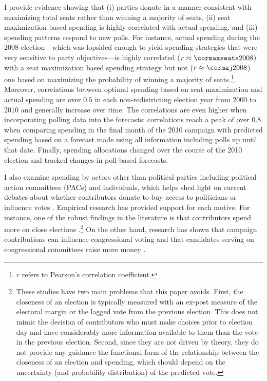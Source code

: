 \documentclass[12pt,final,fleqn]{article}
\theoremstyle{plain}
\begin{document}
I provide evidence showing that (i) parties donate in a manner consistent with maximizing total seats rather than winning a majority of seats, (ii) seat maximization based spending is highly correlated with actual spending, and (iii) spending patterns respond to new polls. For instance, actual spending during the 2008 election---which was lopsided enough to yield spending strategies that were very sensitive to party objectives---is highly correlated ($r \approx \cormaxseats2008$) with a seat maximization based spending strategy but not ($r \approx \cormaj2008$) one based on maximizing the probability of winning a majority of seats.\footnote{$r$ refers to Pearson's correlation coefficient.}. Moreover, correlations between optimal spending based on seat maximization and actual spending are over $0.5$ in each non-redistricting election year from 2000 to 2010 and generally increase over time. The correlations are even higher when incorporating polling data into the forecasts: correlations reach a peak of over 0.8 when comparing spending in the final month of the 2010 campaign with predicted spending based on a forecast made using all information including polls up until that date. Finally, spending allocations changed over the course of the 2010 election and tracked changes in poll-based forecasts.  

I also examine spending by actors other than political parties including political action committees (PACs) and individuals, which helps shed light on current debates about whether contributors donate to buy access to politicians or influence votes \citep[e.g.,][]{stratmann2005some}. Empirical research has provided support for each motive. For instance, one of the robust findings in the literature is that contributors spend more on close elections \citep{jacobson1985money,kau1982general, poole1985patterns, stratmann1991campaign}.\footnote{These studies have two main problems that this paper avoids. First, the closeness of an election is typically measured with an ex-post measure of the electoral margin or the lagged vote from the previous election. This does not mimic the decision of contributors who must make choices prior to election day and have considerably more information available to them than the vote in the previous election. Second, since they are not driven by theory, they do not provide any guidance the functional form of the relationship between the closeness of an election and spending, which should depend on the uncertainty (and probability distribution) of the predicted vote.} On the other hand, research has shown that campaign contributions can influence congressional voting \citep{facchini2011interest, mian2010Apolitical, richter2009lobbying} and that candidates serving on congressional committees raise more money \citep{grier1991committee,kroszner1998interest, romer1994empirical}. 
\end{document}
